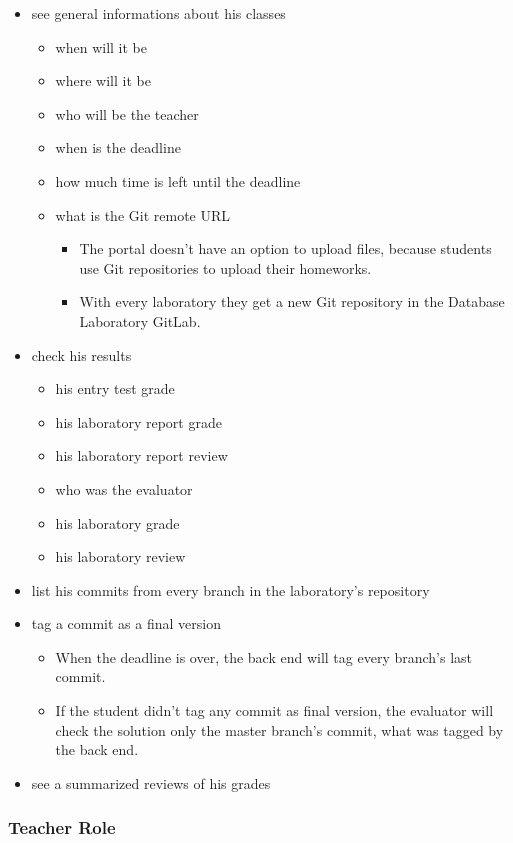 \begin{itemize}
	\item see general informations about his classes
	\begin{itemize}
		\item when will it be
		\item where will it be
		\item who will be the teacher
		\item when is the deadline
		\item how much time is left until the deadline
		\item what is the Git remote URL
		\begin{itemize}
			\item The portal doesn't have an option to upload files, because students use Git repositories to upload their homeworks.
			\item With every laboratory they get a new Git repository in the Database Laboratory GitLab.
		\end{itemize}
	\end{itemize}
	\item check his results
	\begin{itemize}
		\item his entry test grade
		\item his laboratory report grade
		\item his laboratory report review
		\item who was the evaluator
		\item his laboratory grade
		\item his laboratory review
	\end{itemize}
	\item list his commits from every branch in the laboratory's repository
	\item tag a commit as a final version
	\begin{itemize}
		\item When the deadline is over, the back end will tag every branch's last commit.
		\item If the student didn't tag any commit as final version, the evaluator will check the solution only the master branch's commit, what was tagged by the back end.
	\end{itemize}
	\item see a summarized reviews of his grades
\end{itemize}

\subsubsection{Teacher Role}

